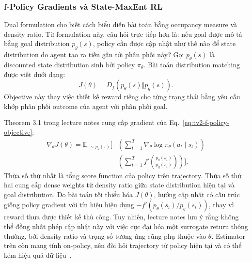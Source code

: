 \subsubsection{f-Policy Gradients và State-MaxEnt RL}

Dual formulation cho biết cách biểu diễn bài toán bằng occupancy measure và density ratio.
Từ formulation này, câu hỏi trực tiếp hơn là: nếu goal được mô tả bằng goal distribution $p_g(s)$, policy cần được cập nhật như thế nào để state distribution do agent tạo ra tiến gần tới phân phối này?
Gọi $p_\theta(s)$ là discounted state distribution sinh bởi policy $\pi_\theta$.
Bài toán distribution matching được viết dưới dạng:
\begin{equation}
    J(\theta)
    =
    D_f\!\left(
        p_\theta(s)
        \Vert
        p_g(s)
    \right).
    \label{eq:tv2-f-policy-objective}
\end{equation}
Objective này thay việc thiết kế reward riêng cho từng trạng thái bằng yêu cầu khớp phân phối outcome của agent với phân phối goal.

Theorem 3.1 trong lecture notes cung cấp gradient của Eq.~\eqref{eq:tv2-f-policy-objective}:
\begin{equation}
\begin{aligned}
    \nabla_\theta J(\theta)
    =
    \mathbb{E}_{\tau\sim p_\theta(\tau)}
    \Bigg[
        &\left(
            \sum_{t=1}^{T}
            \nabla_\theta
            \log \pi_\theta(a_t\mid s_t)
        \right)\\
        &\left(
            \sum_{t=1}^{T}
            f'\!\left(
                \frac{p_\theta(s_t)}
                     {p_g(s_t)}
            \right)
        \right)
    \Bigg].
\end{aligned}
    \label{eq:tv2-f-policy-gradient}
\end{equation}
Thừa số thứ nhất là tổng score function của policy trên trajectory.
Thừa số thứ hai cung cấp dense weights từ density ratio giữa state distribution hiện tại và goal distribution.
Do bài toán tối thiểu hóa $J(\theta)$, hướng cập nhật có cấu trúc giống policy gradient với tín hiệu hiệu dụng $-f'(p_\theta(s_t)/p_g(s_t))$, thay vì reward thưa được thiết kế thủ công.
Tuy nhiên, lecture notes lưu ý rằng không thể đồng nhất phép cập nhật này với việc cực đại hóa một surrogate return thông thường, bởi density ratio và trọng số tương ứng cũng phụ thuộc vào $\theta$.
Estimator trên còn mang tính on-policy, nên đòi hỏi trajectory từ policy hiện tại và có thể kém hiệu quả dữ liệu~\cite{eysenbach2025generativerl}.

